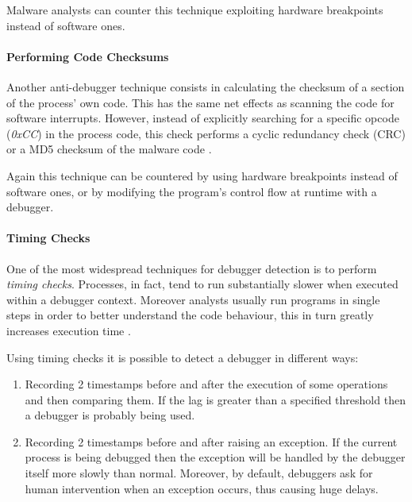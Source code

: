 \documentclass[pdfa%
,cucitura%
]{toptesi}
\begin{document}
Malware analysts can counter this technique exploiting hardware breakpoints instead of software ones.

\paragraph{Performing Code Checksums}
Another anti-debugger technique consists in calculating the checksum of a section of the process' own code. This has the same net effects as scanning the code for software interrupts. However, instead of explicitly searching for a specific opcode (\textit{0xCC}) in the process code, this check performs a cyclic redundancy check (CRC) or a MD5 checksum of the malware code \cite{SikorskiPMA}.

Again this technique can be countered by using hardware breakpoints instead of software ones, or by modifying the program's control flow at runtime with a debugger.

\paragraph{Timing Checks}
One of the most widespread techniques for debugger detection is to perform \textit{timing checks}. Processes, in fact, tend to run substantially slower when executed within a debugger context. Moreover analysts usually run programs in single steps in order to better understand the code behaviour, this in turn greatly increases execution time \cite{SikorskiPMA}.

Using timing checks it is possible to detect a debugger in different ways:
\begin{enumerate}
	\item Recording 2 timestamps before and after the execution of some operations and then comparing them. If the lag is greater than a specified threshold then a debugger is probably being used.
	\item Recording 2 timestamps before and after raising an exception. If the current process is being debugged then the exception will be handled by the debugger itself more slowly than normal. Moreover, by default, debuggers ask for human intervention when an exception occurs, thus causing huge delays.
\end{enumerate}
\end{document}
